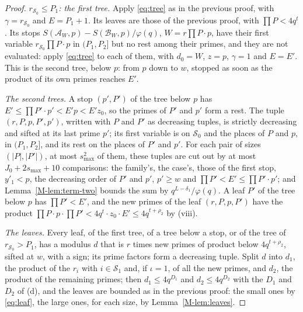 \documentclass[11pt]{article}
\numberwithin{equation}{section}
\begin{document}
\begin{proof}
\emph{$r_{\mathcal S_0} \le P_1$: the first tree.} Apply \eqref{eq:tree} as in the previous proof, with $\gamma =
r_{\mathcal S_0}$ and $E = P_1 + 1$. Its leaves are those of the previous proof, with $\prod P < 4q^t$. Its stops
$S(\mathcal A_W, p) - S(\mathcal B_W, p)/\varphi(q)$, $W = r \prod P \cdot p$, have their first variable $r_{\mathcal
S_0} \prod P \cdot p$ in $(P_1, P_2]$ but no rest among their primes, and they are not evaluated: apply \eqref{eq:tree}
to each of them, with $d_0 = W$, $z = p$, $\gamma = 1$ and $E = E'$. This is the second tree, below $p$: from $p$ down
to $w$, stopped as soon as the product of its own primes reaches $E'$.

\emph{The second trees.} A stop $(p', P')$ of the tree below $p$ has $E' \le \prod P' \cdot p' < E' p < E' z_0$, so the
primes of $P'$ and $p'$ form a rest. The tuple $(r, P, p, P', p')$, written with $P$ and $P'$ as decreasing tuples, is
strictly decreasing and sifted at its last prime $p'$; its first variable is on $\mathcal S_0$ and the places of $P$ and
$p$, in $(P_1, P_2]$, and its rest on the places of $P'$ and $p'$. For each pair of sizes $(|P|, |P'|)$, at most
$s_{\max}^2$ of them, these tuples are cut out by at most $J_0 + 2s_{\max} + 10$ comparisons: the family's, the
case's, those of the first stop, $y'_1 < p$, the decreasing order of $P'$ and $p'$, $p' \ge w$ and $\prod P' < E' \le
\prod P' \cdot p'$; and
Lemma~\ref{M-lem:term-two} bounds the sum by $q^{L - \delta_1}/\varphi(q)$. A leaf $P'$ of the tree below $p$ has $\prod
P' < E'$, and the new primes of the leaf $(r, P, p, P')$ have the product $\prod P \cdot p \cdot \prod P' < 4q^t \cdot
z_0 \cdot E' \le 4q^{t + \rho_2}$ by (viii).

\emph{The leaves.} Every leaf, of the first tree, of a tree below a stop, or of the tree of $r_{\mathcal S_0} > P_1$,
has a modulus $d$ that is $r$ times new primes of product below $4q^{t + \rho_2}$, sifted at $w$, with a sign; its prime
factors form a decreasing tuple. Split $d$ into $d_1$, the product of the $r_i$ with $i \in \mathcal S_1$ and, if $\iota
= 1$, of all the new primes, and $d_2$, the product of the remaining primes; then $d_1 \le 4q^{D_1}$ and $d_2 \le
4q^{D_2}$ with the
$D_1$ and $D_2$ of (d), and the leaves are bounded as in the previous proof: the small ones by \eqref{eq:leaf}, the
large ones, for each size, by Lemma~\ref{M-lem:leaves}.


\end{proof}
\end{document}
